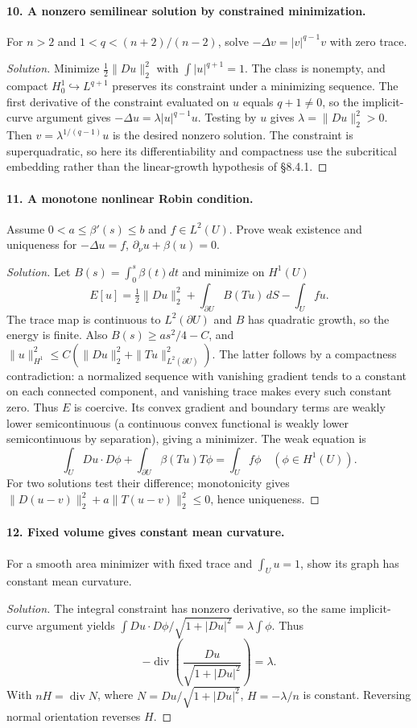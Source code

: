 \Needspace{30mm}
\paragraph{10. A nonzero semilinear solution by constrained minimization.}
For $n>2$ and $1<q<(n+2)/(n-2)$, solve $-\Delta v=|v|^{q-1}v$ with zero trace.
\begin{proof}[Solution]
Minimize $\frac12\|Du\|_2^2$ with $\int|u|^{q+1}=1$.
The class is nonempty, and compact $H^1_0\hookrightarrow L^{q+1}$
preserves its constraint under a minimizing sequence. The first derivative
of the constraint evaluated on $u$ equals $q+1\ne0$, so the implicit-curve
argument gives $-\Delta u=\lambda|u|^{q-1}u$.
Testing by $u$ gives $\lambda=\|Du\|_2^2>0$.
Then $v=\lambda^{1/(q-1)}u$ is the desired nonzero solution.
The constraint is superquadratic, so here its differentiability and compactness
use the subcritical embedding rather than the linear-growth hypothesis
of \S8.4.1.
\end{proof}

\Needspace{30mm}
\paragraph{11. A monotone nonlinear Robin condition.}
Assume $0<a\leq\beta'(s)\leq b$ and $f\in L^2(U)$. Prove weak existence
and uniqueness for $-\Delta u=f$, $\partial_\nu u+\beta(u)=0$.
\begin{proof}[Solution]
Let $B(s)=\int_0^s\beta(t)dt$ and minimize on $H^1(U)$
\[
 E[u]=\tfrac12\|Du\|_2^2+\int_{\partial U}B(Tu)\,dS-\int_Ufu.
\]
The trace map is continuous to $L^2(\partial U)$ and $B$ has quadratic
growth, so the energy is finite. Also
$B(s)\geq a s^2/4-C$, and
$\|u\|_{H^1}^2\leq C(\|Du\|_2^2+\|Tu\|_{L^2(\partial U)}^2)$.
The latter follows by a compactness contradiction: a normalized sequence
with vanishing gradient tends to a constant on each connected component,
and vanishing trace makes every such constant zero.
Thus $E$ is coercive. Its convex gradient and boundary terms are weakly
lower semicontinuous (a continuous convex functional is weakly lower
semicontinuous by separation), giving a minimizer.
The weak equation is
\[
 \int_U Du\cdot D\phi+\int_{\partial U}\beta(Tu)T\phi=\int_Uf\phi
 \quad(\phi\in H^1(U)).
\]
For two solutions test their difference; monotonicity gives
$\|D(u-v)\|_2^2+a\|T(u-v)\|_2^2\leq0$, hence uniqueness.
\end{proof}

\Needspace{30mm}
\paragraph{12. Fixed volume gives constant mean curvature.}
For a smooth area minimizer with fixed trace and $\int_Uu=1$, show its
graph has constant mean curvature.
\begin{proof}[Solution]
The integral constraint has nonzero derivative, so the same implicit-curve
argument yields
$\int Du\cdot D\phi/\sqrt{1+|Du|^2}=\lambda\int\phi$.
Thus
\[
 -\operatorname{div}\left(\frac{Du}{\sqrt{1+|Du|^2}}\right)=\lambda.
\]
With $nH=\operatorname{div}N$, where $N=Du/\sqrt{1+|Du|^2}$,
$H=-\lambda/n$ is constant. Reversing normal orientation reverses $H$.
\end{proof}

